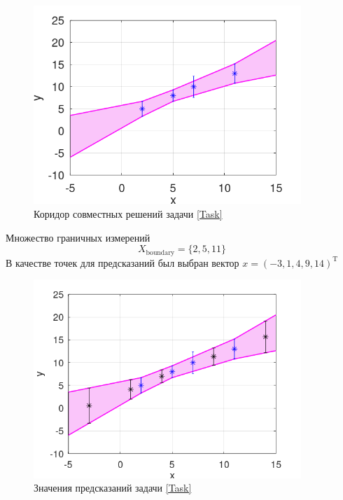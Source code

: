 \begin{figure}[H]\label{Corridor}
\centering
\includegraphics[width=0.9\textwidth]{Graphics/Corridor.png}
\caption{Коридор совместных решений задачи \eqref{Task}} 
\end{figure}
Множество граничных измерений
\begin{equation}
    X_{\mathrm{boundary}}=\{2,5,11\}
\end{equation}
В качестве точек для предсказаний был выбран вектор $x=(-3, 1, 4, 9, 14)^{\mathrm{T}}$
\begin{figure}[H]\label{Predictions}
\centering
\includegraphics[width=0.9\textwidth]{Graphics/Predictions.png}
\caption{Значения предсказаний задачи \eqref{Task}} 
\end{figure}